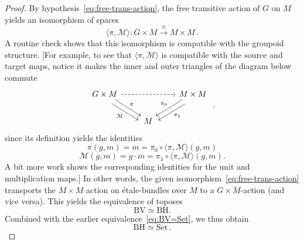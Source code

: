 \documentclass[a4paper, 11pt,reqno]{amsart}
\newcommand{\Set}{\mathrm{Set}}
\newcommand{\M}{\mathcal{M}}
\newcommand{\lranglet}[2]{\langle#1,#2\rangle}
\begin{document}
\begin{proof}
By hypothesis~\eqref{eq:free-trans-action}, the free transitive action of $G$ on $M$ yields an isomorphism of spaces
$$\lranglet{\pi}{\M}\colon G\times M \xrightarrow{\cong} M\times M\,.$$
A routine check shows that this isomorphism is compatible with the groupoid structure. [For example, to see that  $\lranglet{\pi}{\M}$ is compatible with the source and target maps, notice it makes the inner and outer triangles of the diagram below commute
\begin{equation}\label{eq:Step2Diagram}
\begin{tikzcd}
G\times M \ar[rr,dashed] \ar[dr, shift right = 2, swap, "\M"]\ar[dr,shift left=0.5,"\pi"] && M\times M  \ar[dl, shift right = 0.5, swap, "\pi_0"]\ar[dl,shift left=2,"\pi_1"]\\
& M 
\end{tikzcd}\,\,.
\end{equation}
since its definition yields the identities
	\[\pi(g,m)=m=\pi_0\circ \langle\pi,\M\rangle(g,m)\]
\[\M(g,m)=g\cdot m=\pi_1\circ \langle\pi,\M\rangle(g,m).\]
A bit more work shows the corresponding identities for the unit and multiplication maps.] In other words, the given isomorphism~\eqref{eq:free-trans-action} transports the $M\times M$ action on \'{e}tale-bundles over $M$ to a $G\times M$-action (and vice versa). This yields the equivalence of toposes 
\begin{equation}\label{eq:BV=BH}
 \mathrm{BV}\simeq \mathrm{BH}.
\end{equation}
Combined with the earlier equivalence~\eqref{eq:BV=Set}, we thus obtain 
$$\mathrm{BH}\simeq \Set\,.$$

\end{proof}
\end{document}
